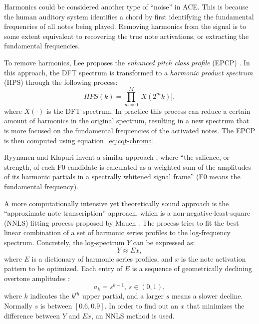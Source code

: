 Harmonics could be considered another type of ``noise'' in ACE. This is because the human auditory system identifies a chord by first identifying the fundamental frequencies of all notes being played. Removing harmonics from the signal is to some extent equivalent to recovering the true note activations, or extracting the fundamental frequencies.

To remove harmonics, Lee proposes the {\it enhanced pitch class profile} (EPCP) \cite{lee2006automatic}. In this approach, the DFT spectrum is transformed to a {\it harmonic product spectrum} (HPS) through the following process:
\begin{equation}
HPS(k) = \prod_{m=0}^M |X(2^mk)|,
\end{equation}
where $X(\cdot)$ is the DFT spectrum. In practice this process can reduce a certain amount of harmonics in the original spectrum, resulting in a new spectrum that is more focused on the fundamental frequencies of the activated notes. The EPCP is then computed using equation~\ref{eq:cqt-chroma}.

Ryynanen and Klapuri invent a similar approach \cite{ryynanen2008automatic}, where ``the salience, or strength, of each F0 candidate is calculated as a weighted sum of the amplitudes of its harmonic partials in a spectrally whitened signal frame'' (F0 means the fundamental frequency).

A more computationally intensive yet theoretically sound approach is the ``approximate note transcription'' approach, which is a non-negative-least-square (NNLS) fitting process proposed by Mauch \cite{mauch2010approximate}. The process tries to fit the best linear combination of a set of harmonic series profiles to the log-frequency spectrum. Concretely, the log-spectrum $Y$ can be expressed as:
\begin{equation} \label{eq:2-nnls}
Y \approx Ex,
\end{equation}
where $E$ is a dictionary of harmonic series profiles, and $x$ is the note activation pattern to be optimized. Each entry of $E$ is a sequence of geometrically declining overtone amplitudes \cite{gomez2006tonal_b}:
\begin{equation}
a_k=s^{k-1},\,s\in(0,1),
\end{equation}
where $k$ indicates the $k^{th}$ upper partial, and a larger $s$ means a slower decline. Normally $s$ is between $[0.6, 0.9]$. In order to find out an $x$ that minimizes the difference between $Y$ and $Ex$, an NNLS method \cite{lawson1995solving} is used.%

